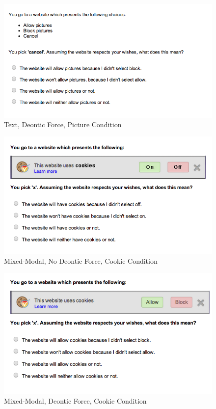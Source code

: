 \begin{figure}[h!]
\centerline{
\includegraphics[scale=.5]{chapter5.tex/textcppic}
}
\caption{Text, Deontic Force, Picture Condition}
\end{figure}


\begin{figure}[h!]
\centerline{
\includegraphics[scale=.5]{chapter5.tex/dialognocpcookie}
}
\caption{Mixed-Modal, No Deontic Force, Cookie Condition}
\end{figure}


\begin{figure}[h!]
\centerline{
\includegraphics[scale=.5]{chapter5.tex/dialogcpcookie}
}
\caption{Mixed-Modal, Deontic Force, Cookie Condition}
\end{figure}



